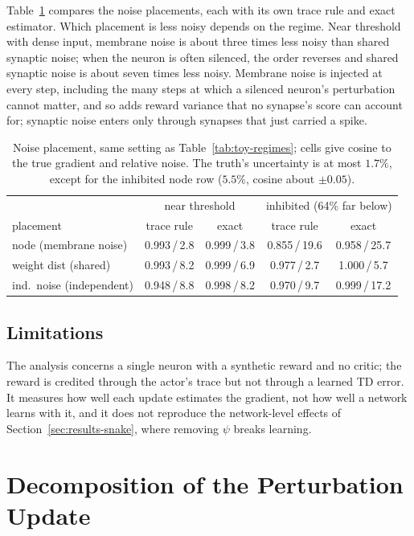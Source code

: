 \documentclass[10pt,twocolumn]{article}
\begin{document}
Table~\ref{tab:toy-placement} compares the noise placements, each with its own
trace rule and exact estimator. Which placement is less noisy depends on the
regime. Near threshold with dense input, membrane noise is about three times
less noisy than shared synaptic noise; when the neuron is often silenced, the
order reverses and shared synaptic noise is about seven times less noisy.
Membrane noise is injected at every step, including the many steps at which a
silenced neuron's perturbation cannot matter, and so adds reward variance that
no synapse's score can account for; synaptic noise enters only through
synapses that just carried a spike.

\begin{table}[h]
\centering\footnotesize
\begin{tabular}{@{}lcccc@{}}
\toprule
& \multicolumn{2}{c}{near threshold} & \multicolumn{2}{c}{inhibited (64\% far below)} \\
placement & trace rule & exact & trace rule & exact \\
\midrule
node (membrane noise)      & 0.993\,/\,2.8 & 0.999\,/\,3.8 & 0.855\,/\,19.6 & 0.958\,/\,25.7 \\
weight dist (shared)       & 0.993\,/\,8.2 & 0.999\,/\,6.9 & 0.977\,/\,2.7 & 1.000\,/\,5.7 \\
ind.\ noise (independent)  & 0.948\,/\,8.8 & 0.998\,/\,8.2 & 0.970\,/\,9.7 & 0.999\,/\,17.2 \\
\bottomrule
\end{tabular}
\caption{Noise placement, same setting as Table~\ref{tab:toy-regimes}; cells
give cosine to the true gradient and relative noise. The truth's uncertainty is
at most $1.7\%$, except for the inhibited node row ($5.5\%$, cosine about
$\pm0.05$).}
\label{tab:toy-placement}
\end{table}

\subsection{Limitations}
\label{app:trace-limits}

The analysis concerns a single neuron with a synthetic reward and no critic;
the reward is credited through the actor's trace but not through a learned TD
error. It measures how well each update estimates the gradient, not how well a
network learns with it, and it does not reproduce the network-level effects of
Section~\ref{sec:results-snake}, where removing $\psi$ breaks learning.


\section{Decomposition of the Perturbation Update}
\label{app:decomp}
\end{document}
